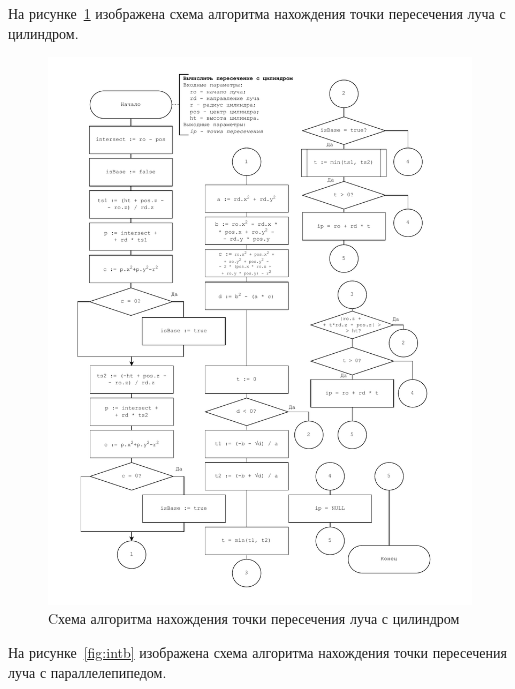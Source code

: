 На рисунке~\ref{fig:intc} изображена схема алгоритма нахождения точки пересечения луча с цилиндром.

\begin{figure}[ht!]
	\begin{center}
		\includegraphics[scale=0.8]{diag/main-raycast-cylinder.pdf}
	\end{center}
	\caption{Cхема алгоритма нахождения точки пересечения луча с цилиндром}
	\label{fig:intc}
\end{figure}

На рисунке~\ref{fig:intb} изображена схема алгоритма нахождения точки пересечения луча с параллелепипедом.

